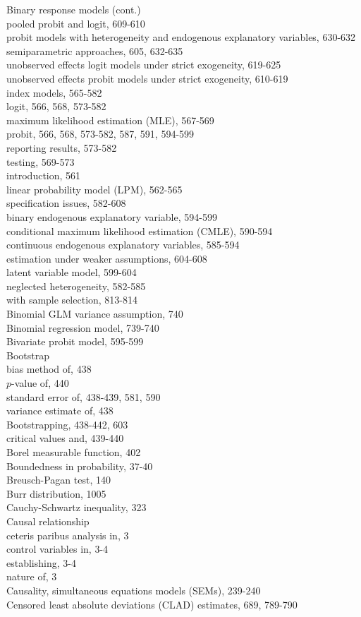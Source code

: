 \documentclass[10pt]{article}
\begin{document}
Binary response models (cont.)\\
pooled probit and logit, 609-610\\
probit models with heterogeneity and endogenous explanatory variables, 630-632\\
semiparametric approaches, 605, 632-635\\
unobserved effects logit models under strict exogeneity, 619-625\\
unobserved effects probit models under strict exogeneity, 610-619\\
index models, 565-582\\
logit, 566, 568, 573-582\\
maximum likelihood estimation (MLE), 567-569\\
probit, 566, 568, 573-582, 587, 591, 594-599\\
reporting results, 573-582\\
testing, 569-573\\
introduction, 561\\
linear probability model (LPM), 562-565\\
specification issues, 582-608\\
binary endogenous explanatory variable, 594-599\\
conditional maximum likelihood estimation (CMLE), 590-594\\
continuous endogenous explanatory variables, 585-594\\
estimation under weaker assumptions, 604-608\\
latent variable model, 599-604\\
neglected heterogeneity, 582-585\\
with sample selection, 813-814\\
Binomial GLM variance assumption, 740\\
Binomial regression model, 739-740\\
Bivariate probit model, 595-599\\
Bootstrap\\
bias method of, 438\\
$p$-value of, 440\\
standard error of, 438-439, 581, 590\\
variance estimate of, 438\\
Bootstrapping, 438-442, 603\\
critical values and, 439-440\\
Borel measurable function, 402\\
Boundedness in probability, 37-40\\
Breusch-Pagan test, 140\\
Burr distribution, 1005\\
Cauchy-Schwartz inequality, 323\\
Causal relationship\\
ceteris paribus analysis in, 3\\
control variables in, 3-4\\
establishing, 3-4\\
nature of, 3\\
Causality, simultaneous equations models (SEMs), 239-240\\
Censored least absolute deviations (CLAD) estimates, 689, 789-790
\end{document}
